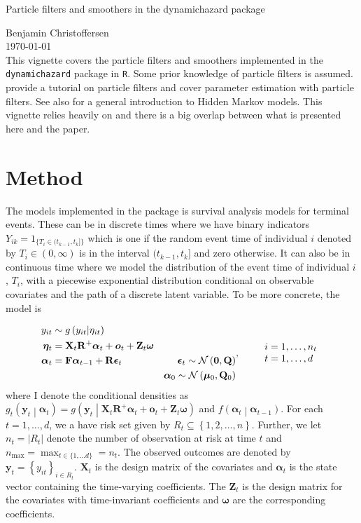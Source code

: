 \documentclass[notitlepage]{article}
\renewcommand{\vec}[1]{\bm{#1}}
\newcommand{\mat}[1]{\mathbf{#1}}
\newcommand{\Lbrace}[1]{\left\{ #1\right\}}
\newcommand{\Lparen}[1]{\left( #1\right)}
\newcommand{\Cond}[2]{ #1 \middle\vert  #2}
\newcommand{\optor}[2]{#1\Lparen{#2}}
\newcommand{\optorC}[3]{\optor{#1}{\Cond{#2}{#3}}}
\newcommand{\normal}[2]{\optor{\mathcal{N}}{#1,#2}}
\newcommand{\nPeriods}{d}
\newcommand{\nMax}{n_{\text{max}}}
\newcommand*{\myTitle}{\begingroup
\centering
{\LARGE Particle filters and smoothers in the dynamichazard package} \\[\baselineskip]
\scshape

Benjamin Christoffersen \\[\baselineskip]
\today \\[\baselineskip]
\vspace*{3\baselineskip}
\endgroup}
\begin{document}
\myTitle
This vignette covers the particle filters and smoothers implemented in the \texttt{dynamichazard} package in \texttt{R}. Some prior knowledge of particle filters is assumed.  \cite{doucet09} provide a tutorial 
on particle filters and \cite{kantas15} cover parameter estimation with particle filters. 
See also \cite{cappe05} for a general introduction to Hidden Markov models. 
This vignette relies heavily on \cite{fearnhead10} and there is a big overlap between what
is presented here and the paper. 

\section{Method}
The models implemented in the package is survival analysis models for terminal
events. These can be in discrete times where we have binary indicators
$Y_{ik} = 1_{\{T_i \in (t_{k-1}, t_k]\}}$ which is one if the random event time
of individual $i$ denoted by 
$T_i\in (0,\infty)$ is in the interval $(t_{k-1}, t_k]$ and zero otherwise.
It can also be in continuous time where we model the distribution of the event 
time of individual $i$, $T_i$, with a
piecewise exponential distribution conditional on observable covariates 
and the path of a discrete latent variable. To be more concrete, the model is

\begin{equation}\label{eqn:model}
\begin{aligned}
 	y_{it} &\sim \optorC{g}{y_{it}}{\eta_{it}} &  \\
%
 	\vec{\eta}_{t} &= \mat{X}_t\mat R^+\vec{\alpha}_t + \vec{o}_t +  
 	\mat{Z}_t\vec{\omega} & \\
%
 	\vec{\alpha}_t &= \mat{F}\vec{\alpha}_{t - 1} + \mat{R}\vec{\epsilon}_t&
 		\vec{\epsilon}_t \sim \normal{\vec 0}{\mat Q} \\
%
	& \vphantom{a} &	\vec{\alpha}_0 \sim \normal{\vec\mu_0}{\mat{Q}_0}
\end{aligned}, \qquad
%
\begin{array}{l} i = 1, \dots, n_t \\ t = 1, \dots, d \end{array}
\end{equation}%
%
where I  denote the conditional densities as %
$\optorC{g_t}{\vec{y}_t}{\vec{\alpha}_t} = %
	\optorC{g}{\vec{y}_t}{\mat{X}_t\mat R^+\vec{\alpha}_t + \vec{o}_t +  \mat{Z}_t\vec{\omega}}$ and $\optorC{f}{\vec{\alpha}_t}{\vec{\alpha}_{t-1}}$. 
For each $t=1,\dots,\nPeriods$, we a have risk set given by $R_t \subseteq \Lbrace{1,2,\dots,n}$. 
Further, we let $n_t = \vert R_t \vert$ denote the number of observation 
at risk at time $t$ 
and $\nMax = \max_{t \in\{1,\dots \nPeriods\}} = n_t$. The observed outcomes 
are denoted by $\vec{y}_t = \Lbrace{y_{it}}_{i \in R_t}$. $\mat{X}_t$ is the 
design matrix of the covariates and $\vec{\alpha}_t$ is the state vector 
containing the time-varying coefficients. 
The $\mat{Z}_t$ is the design matrix for the covariates with time-invariant
coefficients and $\vec{\omega}$ are the corresponding coefficients.
\end{document}
